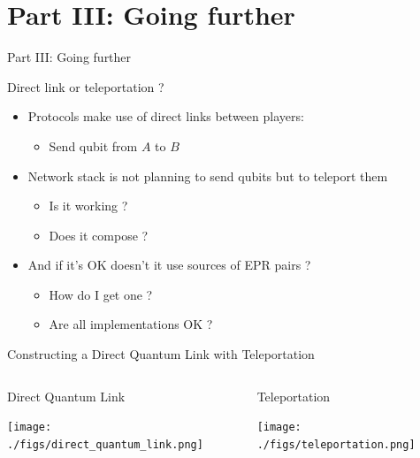 \documentclass[presentation]{beamer}
\begin{document}
\section{Part III: Going further}
\label{sec:orgec8f6e7}
\begin{frame}[label={sec:org6db556e}]{Part III: Going further}
\end{frame}

\begin{frame}[label={sec:org428e766}]{Direct link or teleportation ?}
\begin{itemize}
\item Protocols make use of direct links between players:
\begin{itemize}
\item Send qubit from \(A\) to \(B\)
\end{itemize}
\item Network stack is not planning to send qubits but to teleport them
\begin{itemize}
\item Is it working ?
\item Does it compose ?
\end{itemize}
\item And if it's OK doesn't it use sources of EPR pairs ?
\begin{itemize}
\item How do I get one ?
\item Are all implementations OK ?
\end{itemize}
\end{itemize}
\end{frame}


\begin{frame}[label={sec:org99a55ac}]{Constructing a Direct Quantum Link with Teleportation}
\begin{columns}[t]
\begin{column}{.5\columnwidth}
\begin{block}{Direct Quantum Link}
\begin{center}
\texttt{[image: ./figs/direct\_quantum\_link.png]}
\end{center}
\end{block}
\end{column}
\begin{column}{.5\columnwidth}
\begin{block}{Teleportation}
\begin{center}
\texttt{[image: ./figs/teleportation.png]}
\end{center}
\end{block}
\end{column}
\end{columns}
\end{frame}
\end{document}
